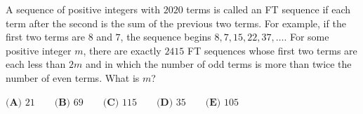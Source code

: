 A sequence of positive integers with $2020$ terms is called an FT sequence if each term after the second is the sum of the previous two terms. For example, if the first two terms are $8$ and $7$, the sequence begins $8,7,15,22,37,\dots$. For some positive integer $m$, there are exactly $2415$ FT sequences whose first two terms are each less than $2m$ and in which the number of odd terms is more than twice the number of even terms. What is $m$?

$\textbf{(A) } 21 \qquad \textbf{(B) } 69 \qquad \textbf{(C) } 115 \qquad \textbf{(D) } 35 \qquad \textbf{(E) } 105$
